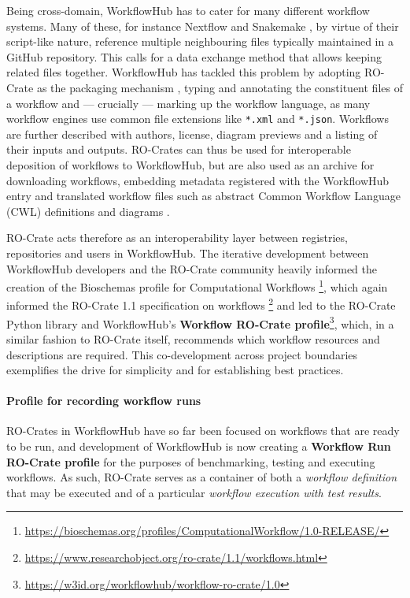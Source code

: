 Being cross-domain, WorkflowHub has to cater for many different workflow
systems. Many of these, for instance Nextflow
\cite{Di Tommaso 2017} and Snakemake
\cite{ch5-73}, by
virtue of their script-like nature, reference multiple neighbouring
files typically maintained in a GitHub repository. This calls for a data
exchange method that allows keeping related files together. WorkflowHub
has tackled this problem by adopting RO-Crate as the packaging mechanism
\cite{Bietrix 2021}, typing and
annotating the constituent files of a workflow and --- crucially ---
marking up the workflow language, as many workflow engines use common
file extensions like \texttt{*.xml} and \texttt{*.json}. Workflows are
further described with authors, license, diagram previews and a listing
of their inputs and outputs. RO-Crates can thus be used for
interoperable deposition of workflows to WorkflowHub, but are also used
as an archive for downloading workflows, embedding metadata registered
with the WorkflowHub entry and translated workflow files such as
abstract Common Workflow Language (CWL)
\cite{Crusoe 2022} definitions and
diagrams \cite{Goble 2021}.

RO-Crate acts therefore as an interoperability layer between registries,
repositories and users in WorkflowHub. The iterative development between
WorkflowHub developers and the RO-Crate community heavily informed the
creation of the Bioschemas
\cite{bioschema-salad} profile for Computational
Workflows \footnote{\url{https://bioschemas.org/profiles/ComputationalWorkflow/1.0-RELEASE/}}, which again informed the
RO-Crate
1.1 specification on workflows \footnote{\url{https://www.researchobject.org/ro-crate/1.1/workflows.html}} and led to the RO-Crate Python library
\cite{ro-crate-py} and
WorkflowHub's
\textbf{Workflow
RO-Crate profile}\footnote{\url{https://w3id.org/workflowhub/workflow-ro-crate/1.0}}, which, in a similar fashion to RO-Crate itself,
recommends which workflow resources and descriptions are required. This
co-development across project boundaries exemplifies the drive for
simplicity and for establishing best practices.

\paragraph{Profile for recording workflow runs}
\label{ch5:profile-for-recording-workflow-runs}

RO-Crates in WorkflowHub have so far been focused on workflows that are
ready to be run, and development of WorkflowHub is now creating a
\textbf{Workflow Run RO-Crate profile} for the purposes of benchmarking,
testing and executing workflows. As such, RO-Crate serves as a container
of both a \emph{workflow definition} that may be executed and of a
particular \emph{workflow execution with test results}.

